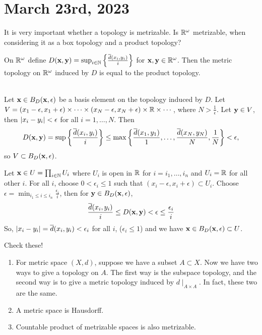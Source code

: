 \section*{March 23rd, 2023}

It is very important whether a topology is metrizable. Is \(\R^\omega\) metrizable, when considering it as a box topology and a product topology?

 On \(\R^\omega\) define \(D(\bf{x}, \bf{y}) = \sup_{i \in \N} \left\{\frac{\bar{d}(x_i, y_i)}{i}\right\}\) for \(\bf{x}, \bf{y} \in \R^\omega\). Then the metric topology on \(\R^\omega\) induced by \(D\) is equal to the product topology.

\pf \\
\note{\(\subset\)} Let \(\bf{x} \in B_D(\bf{x}, \epsilon)\) be a basis element on the topology induced by \(D\). Let \(V = (x_1 - \epsilon, x_1 + \epsilon) \times \cdots \times (x_N - \epsilon, x_N + \epsilon) \times \R \times \cdots\), where \(N > \frac{1}{\epsilon}\). Let \(\bf{y} \in V\), then \(\abs{x_i - y_i} < \epsilon\) for all \(i = 1, \dots, N\). Then
\[
    D(\bf{x}, \bf{y}) = \sup\left\{\frac{\bar{d}(x_i, y_i)}{i}\right\} \leq \max\left\{\frac{\bar{d}(x_1, y_1)}{1}, \dots, \frac{\bar{d}(x_N, y_N)}{N}, \frac{1}{N}\right\} < \epsilon,
\]
so \(V \subset B_D(\bf{x}, \epsilon)\).

\note{\(\supset\)} Let \(\bf{x} \in U = \prod_{i \in \N} U_i\) where \(U_i\) is open in \(\R\) for \(i = i_1, \dots, i_n\) and \(U_i = \R\) for all other \(i\). For all \(i\), choose \(0 < \epsilon_i \leq 1\) such that \((x_i - \epsilon, x_i + \epsilon) \subset U_i\). Choose \(\epsilon = \min_{i_1 \leq i \leq i_n} \frac{\epsilon_i}{i}\), then for \(\bf{y} \in B_D(\bf{x}, \epsilon)\),
\[
    \frac{\bar{d}(x_i, y_i)}{i} \leq D(\bf{x}, \bf{y}) < \epsilon \leq \frac{\epsilon_i}{i}
\]
So, \(\abs{x_i - y_i} = \bar{d}(x_i, y_i) < \epsilon_i\) for all \(i\), (\(\epsilon_i \leq 1\)) and we have \(\bf{x} \in B_D(\bf{x}, \epsilon) \subset U\).


\rmk Check these!
\begin{enumerate}
    \item For metric space \((X, d)\), suppose we have a subset \(A \subset X\). Now we have two ways to give a topology on \(A\). The first way is the subspace topology, and the second way is to give a metric topology induced by \(d \mid_{A\times A}\). In fact, these two are the same.

    \item A metric space is Hausdorff.

    \item Countable product of metrizable spaces is also metrizable.
\end{enumerate}

